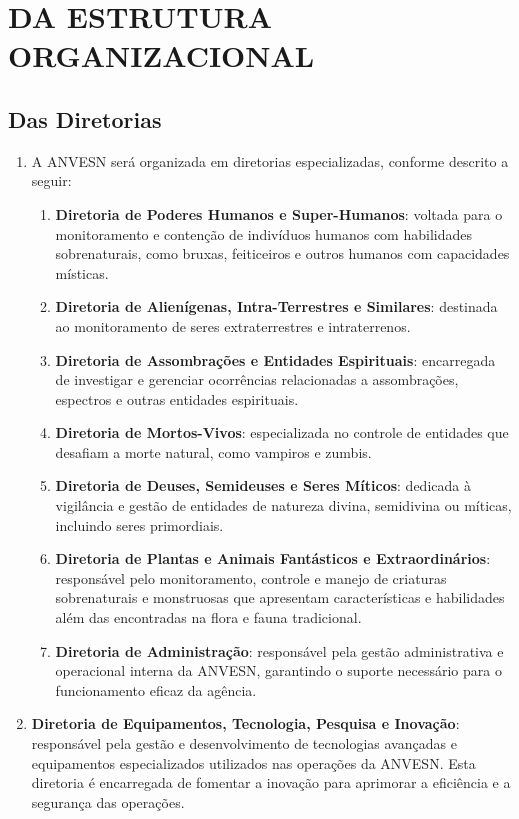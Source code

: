 \documentclass[a4paper,12pt]{report}
\begin{document}
\chapter{DA ESTRUTURA ORGANIZACIONAL}

\section{Das Diretorias}

\begin{enumerate}[resume, label=Art. \arabic*]

\item A ANVESN será organizada em diretorias especializadas, conforme descrito a seguir:

\begin{enumerate}[label=\roman*.]

\item \textbf{Diretoria de Poderes Humanos e Super-Humanos}: voltada para o monitoramento e contenção de indivíduos humanos com habilidades sobrenaturais, como bruxas, feiticeiros e outros humanos com capacidades místicas.

\item \textbf{Diretoria de Alienígenas, Intra-Terrestres e Similares}: destinada ao monitoramento de seres extraterrestres e intraterrenos.

\item \textbf{Diretoria de Assombrações e Entidades Espirituais}: encarregada de investigar e gerenciar ocorrências relacionadas a assombrações, espectros e outras entidades espirituais.

\item \textbf{Diretoria de Mortos-Vivos}: especializada no controle de entidades que desafiam a morte natural, como vampiros e zumbis.

\item \textbf{Diretoria de Deuses, Semideuses e Seres Míticos}: dedicada à vigilância e gestão de entidades de natureza divina, semidivina ou míticas, incluindo seres primordiais.

\item \textbf{Diretoria de Plantas e Animais Fantásticos e Extraordinários}: responsável pelo monitoramento, controle e manejo de criaturas sobrenaturais e monstruosas que apresentam características e habilidades além das encontradas na flora e fauna tradicional.

\item \textbf{Diretoria de Administração}: responsável pela gestão administrativa e operacional interna da ANVESN, garantindo o suporte necessário para o funcionamento eficaz da agência. 
\end{enumerate}

\item \textbf{Diretoria de Equipamentos, Tecnologia, Pesquisa e Inovação}: responsável pela gestão e desenvolvimento de tecnologias avançadas e equipamentos especializados utilizados nas operações da ANVESN. Esta diretoria é encarregada de fomentar a inovação para aprimorar a eficiência e a segurança das operações. 
\end{enumerate}
\end{document}

